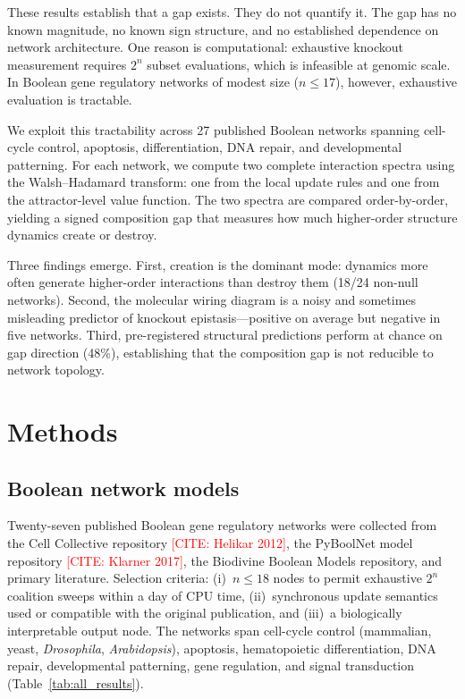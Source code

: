 \documentclass[11pt]{article}
\newcommand{\citeneeded}[1]{\textcolor{red}{[CITE: #1]}}
\begin{document}
These results establish that a gap exists. They do not quantify it.
The gap has no known magnitude, no known sign structure, and no
established dependence on network architecture. One reason is
computational: exhaustive knockout measurement requires $2^n$ subset
evaluations, which is infeasible at genomic scale. In Boolean gene
regulatory networks of modest size ($n \leq 17$), however, exhaustive
evaluation is tractable.

We exploit this tractability across 27 published Boolean networks
spanning cell-cycle control, apoptosis, differentiation, DNA repair,
and developmental patterning. For each network, we compute two
complete interaction spectra using the Walsh--Hadamard transform: one
from the local update rules and one from the attractor-level value
function. The two spectra are compared order-by-order, yielding a
signed composition gap that measures how much higher-order structure
dynamics create or destroy.

Three findings emerge. First, creation is the dominant mode: dynamics
more often generate higher-order interactions than destroy them (18/24
non-null networks). Second, the molecular wiring diagram is a noisy
and sometimes misleading predictor of knockout epistasis---positive on
average but negative in five networks. Third, pre-registered
structural predictions perform at chance on gap direction (48\%),
establishing that the composition gap is not reducible to network
topology.


\section{Methods}
\label{sec:methods}

\subsection{Boolean network models}
\label{sec:models}

Twenty-seven published Boolean gene regulatory networks were collected
from the Cell Collective repository \citeneeded{Helikar 2012}, the
PyBoolNet model repository \citeneeded{Klarner 2017}, the Biodivine
Boolean Models repository, and primary literature. Selection criteria:
(i)~$n \leq 18$ nodes to permit exhaustive $2^n$ coalition sweeps
within a day of CPU time, (ii)~synchronous update semantics used or
compatible with the original publication, and (iii)~a biologically
interpretable output node. The networks span cell-cycle control
(mammalian, yeast, \emph{Drosophila}, \emph{Arabidopsis}), apoptosis,
hematopoietic differentiation, DNA repair, developmental patterning,
gene regulation, and signal transduction (Table~\ref{tab:all_results}).
\end{document}
